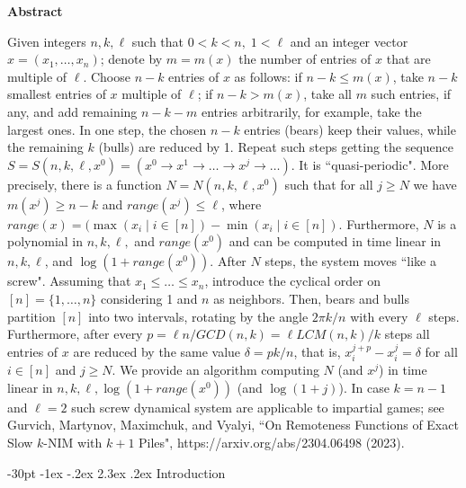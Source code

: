 \documentclass[10pt]{article}
\makeatletter
\renewcommand\section{\@startsection {section}{1}{\z@}
{-30pt \@plus -1ex \@minus -.2ex}
{2.3ex \@plus.2ex}
{\normalfont\normalsize\bfseries\boldmath}}
\theoremstyle{definition}
\makeatother
\begin{document}
\centerline{\bf Abstract}
\noindent
Given integers  $n,k,\ell$  such that  $0<k<n, \; 1<\ell$    
and an integer vector 
\newline 
$x = (x_1,\ldots,x_n)$; 
denote by $m = m(x)$  the number of entries of  $x$  
that are multiple of  $\ell$. 
\newline 
Choose  $n-k$  entries of $x$ as follows:
if  $n-k \leq m(x)$,  take  $n-k$  
smallest entries of $x$  multiple of $\ell$; 
if  $n-k > m(x)$, take all $m$ such entries,  
if any, and add remaining  $n-k-m$  entries arbitrarily, 
for example, take the largest ones. 
\newline
In one step, the chosen  $n-k$  entries 
(bears) keep their values, 
while the remaining  $k$  (bulls) are reduced by 1. 
Repeat such steps getting the sequence  
\newline 
$S = S(n,k,\ell,x^0) = (x^0 \to x^1 \to \ldots \to x^j \to \ldots)$.  
It is ``quasi-periodic". 
\newline 
More precisely, 
there is a function $N = N(n,k,\ell,x^0)$  such that 
for all $j \geq N$ we have 
$m(x^j) \geq n-k$ and $range(x^j) \leq \ell$, where 
$range(x) = (\max(x_i \mid i \in [n]) - \min(x_i \mid i \in [n])$.
Furthermore, $N$ is a polynomial in $n,k,\ell,$ and $range(x^0)$ 
and can be computed in time linear in 
$n,k,\ell$, and $\log(1 + range(x^0))$.
\newline 
After $N$ steps, the system  moves ``like a screw". 
Assuming that $x_1 \leq \dots \leq x_n$, 
introduce the cyclical order on $[n] = \{1, \ldots, n\}$ 
considering  1 and $n$ as neighbors. 
Then, bears and bulls partition $[n]$ into two intervals, 
rotating by the angle $2 \pi k /n$  with every $\ell$  steps. 
Furthermore, after every 
$p = \ell n / GCD(n,k) = \ell LCM(n,k) / k$  steps  
all entries of $x$  are reduced by the same value  $\delta = pk/n$, 
that is, $x_i^{j+p} - x_i^j = \delta$ 
for all $i \in [n]$ and  $j \geq N$. 
We provide an algorithm computing  $N$ 
(and  $x^j$)  in time linear in  
$n,k,\ell, \log(1 + range(x^0))$ (and $\log (1+j)$).  
\newline 
In case  $k=n-1$ and $\ell = 2$  
such screw dynamical system are applicable to impartial games; 
see  Gurvich, Martynov, Maximchuk, and Vyalyi,  
``On Remoteness Functions of Exact Slow $k$-NIM with $k+1$ Piles",  
https://arxiv.org/abs/2304.06498 (2023).
\newline 
{} 

\section{Introduction} 
\label{s0}
\end{document}
